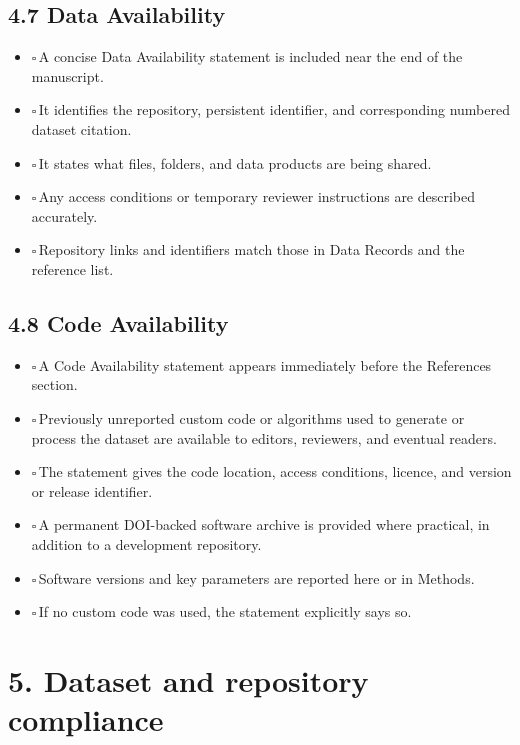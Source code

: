 \documentclass[11pt]{article}
\newcommand{\cbox}{$\square$\,}
\begin{document}
\subsection*{4.7 Data Availability}

\begin{itemize}
    \item \cbox A concise Data Availability statement is included near the end of the manuscript.
    \item \cbox It identifies the repository, persistent identifier, and corresponding numbered dataset citation.
    \item \cbox It states what files, folders, and data products are being shared.
    \item \cbox Any access conditions or temporary reviewer instructions are described accurately.
    \item \cbox Repository links and identifiers match those in Data Records and the reference list.
\end{itemize}

\subsection*{4.8 Code Availability}

\begin{itemize}
    \item \cbox A Code Availability statement appears immediately before the References section.
    \item \cbox Previously unreported custom code or algorithms used to generate or process the dataset are available to editors, reviewers, and eventual readers.
    \item \cbox The statement gives the code location, access conditions, licence, and version or release identifier.
    \item \cbox A permanent DOI-backed software archive is provided where practical, in addition to a development repository.
    \item \cbox Software versions and key parameters are reported here or in Methods.
    \item \cbox If no custom code was used, the statement explicitly says so.
\end{itemize}

\section*{5. Dataset and repository compliance}
\end{document}
